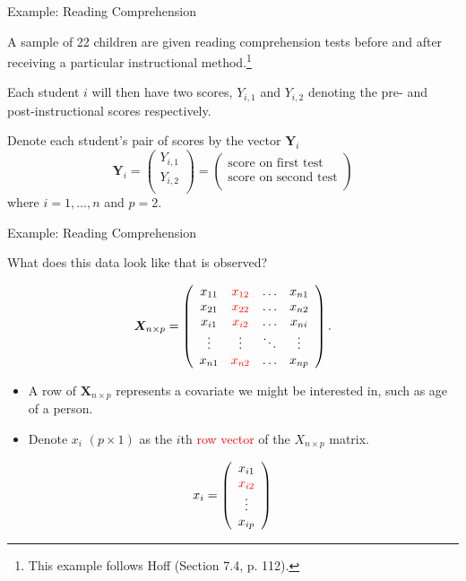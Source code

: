 \documentclass[
  ignorenonframetext,
]{beamer}
\begin{document}
\begin{frame}{Example: Reading Comprehension}
\protect\hypertarget{example-reading-comprehension}{}

A sample of 22 children are given reading comprehension tests before and
after receiving a particular instructional
method.\footnote{This example follows Hoff (Section 7.4, p. 112).}

Each student \(i\) will then have two scores, \(Y_{i,1}\) and
\(Y_{i,2}\) denoting the pre- and post-instructional scores
respectively.

Denote each student's pair of scores by the vector \(\bm{Y}_i\) \[
\bm{Y}_{i} = \left( \begin{array}{c}
Y_{i,1}\\
Y_{i,2}\\
\end{array} \right) 
= \left( \begin{array}{c}
\text{score on first test}\\
\text{score on second test}\\
\end{array} \right)
\] where \(i=1,\ldots,n\) and \(p=2.\)

\end{frame}

\begin{frame}{Example: Reading Comprehension}
\protect\hypertarget{example-reading-comprehension-1}{}

What does this data look like that is observed?

\[\bm{X}_{n \times p} = 
\left( \begin{array}{cccc}
x_{11} & \textcolor{red}{x_{12}} & \ldots&  x_{n1}\\
x_{21} & \textcolor{red}{x_{22}} & \ldots& x_{n2} \\
x_{i1} & \textcolor{red}{x_{i2}} & \ldots& x_{ni} \\
\vdots & \vdots & \ddots & \vdots \\
x_{n1} & \textcolor{red}{x_{n2}} &\ldots& x_{np}
\end{array} \right).
\]

\begin{itemize}
\item
  A row of \(\bm{X}_{n \times p}\) represents a covariate we might be
  interested in, such as age of a person.
\item
  Denote \(x_{i}\) \((p \times 1)\) as the \(i\)th
  \textcolor{red}{row vector} of the \(X_{n \times p}\) matrix.
\end{itemize}

\[  x_{i}= \left( \begin{array}{c}
x_{i1}\\
\textcolor{red}{x_{i2}}\\
\vdots\\
x_{ip}
\end{array} \right) \]

\end{frame}
\end{document}
